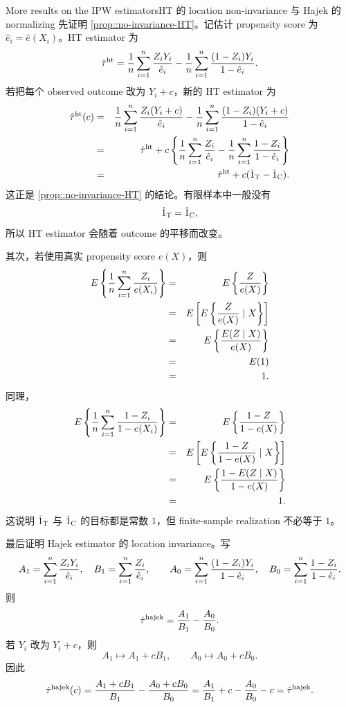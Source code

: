 \begin{exercisesolution}{More results on the IPW estimators}{HT 的 location non-invariance 与 Hajek 的 normalizing}
先证明 \cref{prop::no-invariance-HT}。记估计 propensity score 为 $\hat e_i=\hat e(X_i)$。HT estimator 为
\[
\hat{\tau}^{\textup{ht}}
=\frac{1}{n}\sum_{i=1}^n \frac{Z_iY_i}{\hat e_i}
-\frac{1}{n}\sum_{i=1}^n \frac{(1-Z_i)Y_i}{1-\hat e_i}.
\]
若把每个 observed outcome 改为 $Y_i+c$，新的 HT estimator 为
\begin{eqnarray*}
\hat{\tau}^{\textup{ht}}(c)
&=&\frac{1}{n}\sum_{i=1}^n \frac{Z_i(Y_i+c)}{\hat e_i}
-\frac{1}{n}\sum_{i=1}^n \frac{(1-Z_i)(Y_i+c)}{1-\hat e_i}\\
&=&\hat{\tau}^{\textup{ht}}
+c\left\{
\frac{1}{n}\sum_{i=1}^n \frac{Z_i}{\hat e_i}
-\frac{1}{n}\sum_{i=1}^n \frac{1-Z_i}{1-\hat e_i}
\right\}\\
&=&\hat{\tau}^{\textup{ht}}
+c(\hat 1_{\textsc{T}}-\hat 1_{\textsc{C}}).
\end{eqnarray*}
这正是 \cref{prop::no-invariance-HT} 的结论。有限样本中一般没有
\[
\hat 1_{\textsc{T}}=\hat 1_{\textsc{C}},
\]
所以 HT estimator 会随着 outcome 的平移而改变。

其次，若使用真实 propensity score $e(X)$，则
\begin{eqnarray*}
E\left\{\frac{1}{n}\sum_{i=1}^n \frac{Z_i}{e(X_i)}\right\}
&=&E\left\{\frac{Z}{e(X)}\right\}\\
&=&E\left[E\left\{\frac{Z}{e(X)}\mid X\right\}\right]\\
&=&E\left\{\frac{E(Z\mid X)}{e(X)}\right\}\\
&=&E(1)\\
&=&1.
\end{eqnarray*}
同理，
\begin{eqnarray*}
E\left\{\frac{1}{n}\sum_{i=1}^n \frac{1-Z_i}{1-e(X_i)}\right\}
&=&E\left\{\frac{1-Z}{1-e(X)}\right\}\\
&=&E\left[E\left\{\frac{1-Z}{1-e(X)}\mid X\right\}\right]\\
&=&E\left\{\frac{1-E(Z\mid X)}{1-e(X)}\right\}\\
&=&1.
\end{eqnarray*}
这说明 $\hat 1_{\textsc{T}}$ 与 $\hat 1_{\textsc{C}}$ 的目标都是常数 $1$，但 finite-sample realization 不必等于 $1$。

最后证明 Hajek estimator 的 location invariance。写
\[
A_1=\sum_{i=1}^n \frac{Z_iY_i}{\hat e_i},\quad
B_1=\sum_{i=1}^n \frac{Z_i}{\hat e_i},\qquad
A_0=\sum_{i=1}^n \frac{(1-Z_i)Y_i}{1-\hat e_i},\quad
B_0=\sum_{i=1}^n \frac{1-Z_i}{1-\hat e_i}.
\]
则
\[
\hat\tau^{\textup{hajek}}=\frac{A_1}{B_1}-\frac{A_0}{B_0}.
\]
若 $Y_i$ 改为 $Y_i+c$，则
\[
A_1\mapsto A_1+cB_1,\qquad A_0\mapsto A_0+cB_0.
\]
因此
\[
\hat\tau^{\textup{hajek}}(c)
=\frac{A_1+cB_1}{B_1}-\frac{A_0+cB_0}{B_0}
=\frac{A_1}{B_1}+c-\frac{A_0}{B_0}-c
=\hat\tau^{\textup{hajek}}.
\]


\end{exercisesolution}
